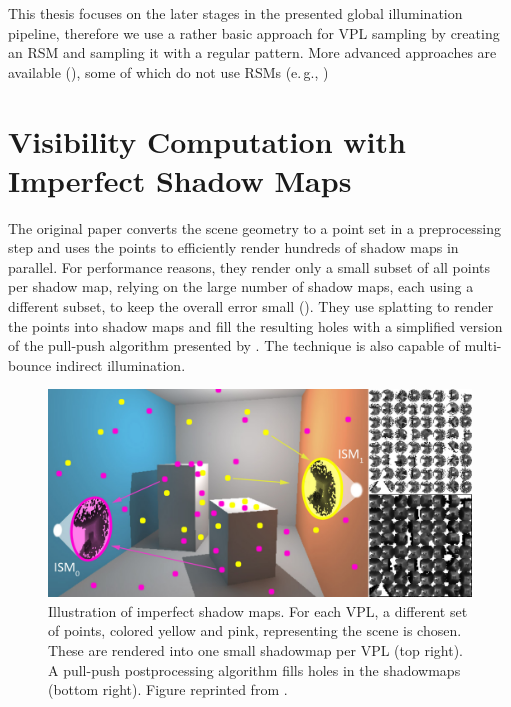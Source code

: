 This thesis focuses on the later stages in the presented global illumination pipeline, therefore we use a rather basic approach for VPL sampling by creating an RSM and sampling it with a regular pattern. More advanced approaches are available (), some of which do not use RSMs (e.\,g., \cite{hedman2016sequential})


\section{Visibility Computation with Imperfect Shadow Maps}
\label{sec:concept:ism}

The original paper \citep{ritschel2008ism} converts the scene geometry to a point set in a preprocessing step and uses the points to efficiently render hundreds of shadow maps in parallel. For performance reasons, they render only a small subset of all points per shadow map, relying on the large number of shadow maps, each using a different subset, to keep the overall error small (). They use splatting to render the points into shadow maps and fill the resulting holes with a simplified version of the pull-push algorithm presented by \citet{Marroquim:2007:reconstruction}. The technique is also capable of multi-bounce indirect illumination.

\begin{figure}[htb]
\centering
    \includegraphics[width=\textwidth]{graphics/ism_ritschel_08}
  \caption{Illustration of imperfect shadow maps. For each VPL, a different set of points, colored yellow and pink, representing the scene is chosen. These are rendered into one small shadowmap per VPL (top right). A pull-push postprocessing algorithm fills holes in the shadowmaps (bottom right). Figure reprinted from \citet{ritschel2008ism}.}
  \label{fig:concept:ism_ritschel_08}
\end{figure}

